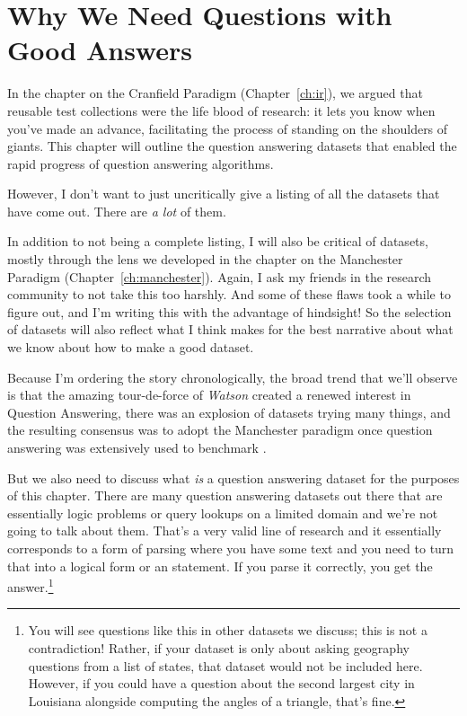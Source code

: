 \label{chapter:nq}

\section{Why We Need Questions with Good Answers}

In the chapter on the Cranfield Paradigm (Chapter~\ref{ch:ir}), we argued
that reusable test collections were the life blood of research: it
lets you know when you've made an advance, facilitating the process of
standing on the shoulders of giants.
%
This chapter will outline the question answering datasets that enabled
the rapid progress of question answering algorithms.

However, I don't want to just uncritically give a listing of all the
datasets that have come out.
%
There are \emph{a lot} of them.

In addition to not being a complete listing, I will also be critical
of datasets, mostly through the lens we developed in the chapter on
the Manchester Paradigm (Chapter~\ref{ch:manchester}).
%
Again, I ask my friends in the research community to not take this too
harshly.
%
And some of these flaws took a while to figure out, and I'm writing
this with the advantage of hindsight!
%
So the selection of datasets will also reflect what I think makes for
the best narrative about what we know about how to make a good
dataset.

Because I'm ordering the story chronologically, the broad trend that
we'll observe is that the amazing tour-de-force of \textit{Watson}
created a renewed interest in Question Answering, there was an
explosion of datasets trying many things, and the resulting consensus
was to adopt the Manchester paradigm once question answering was
extensively used to benchmark .

But we also need to discuss what \emph{is} a question answering
dataset for the purposes of this chapter.
%
There are many question answering datasets out there that are
essentially logic problems or  query lookups on a limited
domain and we're not going to talk about them.
%
That's a very valid line of research and it essentially corresponds to
a form of parsing where you have some text and you need to turn that
into a logical form or an  statement.
%
If you parse it correctly, you get the answer.\footnote{You will see
  questions like this in other datasets we discuss; this is not a
  contradiction!  Rather, if your dataset is only about asking
  geography questions from a list of  states, that dataset
  would not be included here.  However, if you could have a question
  about the second largest city in Louisiana alongside computing the
  angles of a triangle, that's fine.}


